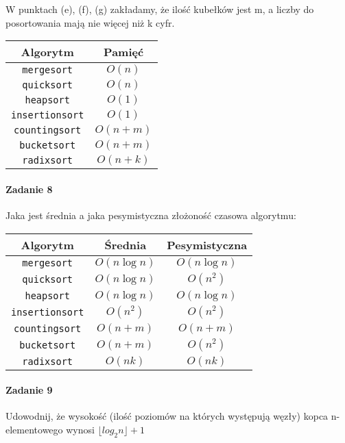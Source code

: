\documentclass[18pt]{extarticle}
\begin{document}
    W punktach (e), (f), (g) zakładamy, że ilość kubełków jest m, a liczby do posortowania mają nie więcej niż k cyfr.
\begin{center}
    \begin{tabular}{c c}
        \textbf{Algorytm}    & \textbf{Pamięć} \\
        \hline
        \verb+mergesort+     & $O(n)$          \\
        \verb+quicksort+     & $O(n)$          \\
        \verb+heapsort+      & $O(1)$          \\
        \verb+insertionsort+ & $O(1)$          \\
        \verb+countingsort+  & $O(n+m)$        \\
        \verb+bucketsort+    & $O(n+m)$        \\
        \verb+radixsort+     & $O(n+k)$
    \end{tabular}
\end{center}

\paragraph{Zadanie 8} Jaka jest średnia a jaka pesymistyczna złożoność czasowa algorytmu:
\begin{center}
    \begin{tabular}{c c c}
        \textbf{Algorytm}    & \textbf{Średnia} & \textbf{Pesymistyczna} \\
        \hline
        \verb+mergesort+     & $O(n \log n)$    & $O(n \log n)$          \\
        \verb+quicksort+     & $O(n \log n)$    & $O(n^2)$               \\
        \verb+heapsort+      & $O(n \log n)$    & $O(n \log n)$          \\
        \verb+insertionsort+ & $O(n^2)$         & $O(n^2)$               \\
        \verb+countingsort+  & $O(n+m)$         & $O(n+m)$               \\
        \verb+bucketsort+    & $O(n+m)$         & $O(n^2)$               \\
        \verb+radixsort+     & $O(nk)$         & $O(nk)$
    \end{tabular}
\end{center}

\paragraph{Zadanie 9} Udowodnij, że wysokość (ilość poziomów na których występują węzły) kopca n-elementowego wynosi $\lfloor log_2 n \rfloor + 1$ \\
\end{document}
